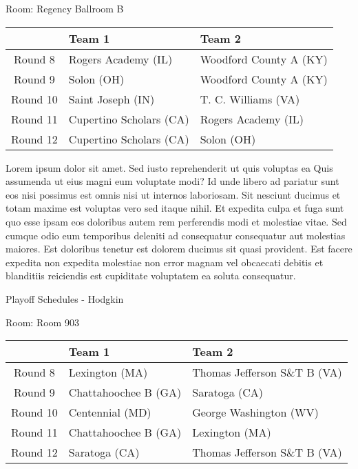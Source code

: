 \documentclass{article}%
\begin{document}
\linebreak%
\begin{flushleft}%
\begin{Large}%
Room: Regency Ballroom B%
\end{Large}%
\end{flushleft}%
\begin{tabularx}{\textwidth}{|c|Y|Y|}%
\hline%
&Team 1&Team 2\\%
\hline%
Round 8&Rogers Academy (IL)&Woodford County A (KY)\\%
Round 9&Solon (OH)&Woodford County A (KY)\\%
Round 10&Saint Joseph (IN)&T. C. Williams (VA)\\%
Round 11&Cupertino Scholars (CA)&Rogers Academy (IL)\\%
Round 12&Cupertino Scholars (CA)&Solon (OH)\\%
\hline%
\end{tabularx}%
\vspace*{8pt}%
\linebreak%
\newline%
Lorem ipsum dolor sit amet. Sed iusto reprehenderit ut quis voluptas ea Quis assumenda ut eius magni eum voluptate modi? Id unde libero ad pariatur sunt eos nisi possimus est omnis nisi ut internos laboriosam. Sit nesciunt ducimus et totam maxime est voluptas vero sed itaque nihil. Et expedita culpa et fuga sunt quo esse ipsam eos doloribus autem rem perferendis modi et molestiae vitae.\newline%
\newline%
Sed cumque odio eum temporibus deleniti ad consequatur consequatur aut molestias maiores. Est doloribus tenetur est dolorem ducimus sit quasi provident. Est facere expedita non expedita molestiae non error magnam vel obcaecati debitis et blanditiis reiciendis est cupiditate voluptatem ea soluta consequatur.%
\newpage%
\begin{center}%
\begin{Huge}%
Playoff Schedules {-} Hodgkin%
\end{Huge}%
\end{center}%
\begin{flushleft}%
\begin{Large}%
Room: Room 903%
\end{Large}%
\end{flushleft}%
\begin{tabularx}{\textwidth}{|c|Y|Y|}%
\hline%
&Team 1&Team 2\\%
\hline%
Round 8&Lexington (MA)&Thomas Jefferson S\&T B (VA)\\%
Round 9&Chattahoochee B (GA)&Saratoga (CA)\\%
Round 10&Centennial (MD)&George Washington (WV)\\%
Round 11&Chattahoochee B (GA)&Lexington (MA)\\%
Round 12&Saratoga (CA)&Thomas Jefferson S\&T B (VA)\\%
\hline%
\end{tabularx}%
\end{document}
